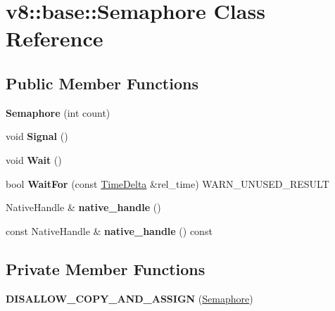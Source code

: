 \hypertarget{classv8_1_1base_1_1_semaphore}{}\section{v8\+:\+:base\+:\+:Semaphore Class Reference}
\label{classv8_1_1base_1_1_semaphore}
\subsection*{Public Member Functions}
\begin{DoxyCompactItemize}
\item 
{\bfseries Semaphore} (int count)\hypertarget{classv8_1_1base_1_1_semaphore_a6e6256b4b8007e24a6cd75d88016013b}{}\label{classv8_1_1base_1_1_semaphore_a6e6256b4b8007e24a6cd75d88016013b}

\item 
void {\bfseries Signal} ()\hypertarget{classv8_1_1base_1_1_semaphore_a95ee194fdea88172c20132a95ac8ca59}{}\label{classv8_1_1base_1_1_semaphore_a95ee194fdea88172c20132a95ac8ca59}

\item 
void {\bfseries Wait} ()\hypertarget{classv8_1_1base_1_1_semaphore_afa492a527fe740fb20024a4146833f32}{}\label{classv8_1_1base_1_1_semaphore_afa492a527fe740fb20024a4146833f32}

\item 
bool {\bfseries Wait\+For} (const \hyperlink{classv8_1_1base_1_1_time_delta}{Time\+Delta} \&rel\+\_\+time) W\+A\+R\+N\+\_\+\+U\+N\+U\+S\+E\+D\+\_\+\+R\+E\+S\+U\+LT\hypertarget{classv8_1_1base_1_1_semaphore_af6ce91745ab0ba8d4b5a62a5cab69a6d}{}\label{classv8_1_1base_1_1_semaphore_af6ce91745ab0ba8d4b5a62a5cab69a6d}

\item 
Native\+Handle \& {\bfseries native\+\_\+handle} ()\hypertarget{classv8_1_1base_1_1_semaphore_ae8cf6e4317e9ad6098d3bae3fdc355ce}{}\label{classv8_1_1base_1_1_semaphore_ae8cf6e4317e9ad6098d3bae3fdc355ce}

\item 
const Native\+Handle \& {\bfseries native\+\_\+handle} () const \hypertarget{classv8_1_1base_1_1_semaphore_a1351d15d48eb96c99db322512cb1d0af}{}\label{classv8_1_1base_1_1_semaphore_a1351d15d48eb96c99db322512cb1d0af}

\end{DoxyCompactItemize}
\subsection*{Private Member Functions}
\begin{DoxyCompactItemize}
\item 
{\bfseries D\+I\+S\+A\+L\+L\+O\+W\+\_\+\+C\+O\+P\+Y\+\_\+\+A\+N\+D\+\_\+\+A\+S\+S\+I\+GN} (\hyperlink{classv8_1_1base_1_1_semaphore}{Semaphore})\hypertarget{classv8_1_1base_1_1_semaphore_ae7793e010a60a5ba34c1ecdfdc1202f4}{}\label{classv8_1_1base_1_1_semaphore_ae7793e010a60a5ba34c1ecdfdc1202f4}

\end{DoxyCompactItemize}
